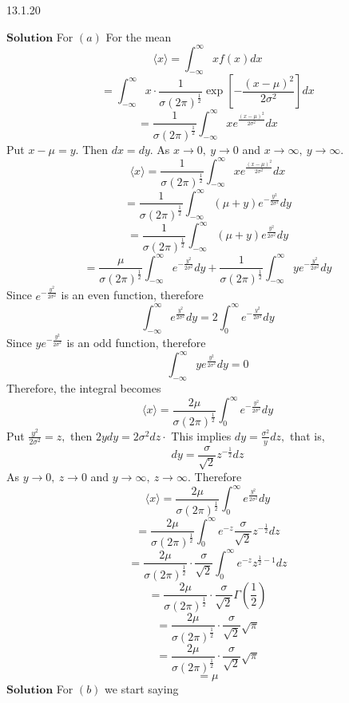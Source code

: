 \documentclass{article}
\begin{document}
\begin{flushleft}
\begin{mybox}{13.1.20}
\end{mybox}

$\boxed{\textbf{Solution}}$ For $(a)$ For the mean
$$
\langle x\rangle=\int_{-\infty}^{\infty} x f(x) d x
$$
$$
=\int_{-\infty}^{\infty} x \cdot \frac{1}{\sigma(2 \pi)^{\frac{1}{2}}} \exp \left[-\frac{(x-\mu)^{2}}{2 \sigma^{2}}\right] d x
$$
$$
=\frac{1}{\sigma(2 \pi)^{\frac{1}{2}}} \int_{-\infty}^{\infty} x e^{\frac{(x-\mu)^{2}}{2 \sigma^{2}}} d x
$$
Put $x-\mu=y .$ Then $d x=d y .$ As $x \rightarrow 0, \  y \rightarrow 0$ and $x \rightarrow \infty, \  y \rightarrow \infty$.
$$
\langle x\rangle=\frac{1}{\sigma(2 \pi)^{\frac{1}{2}}} \int_{-\infty}^{\infty} x e^{\frac{(x-\mu)^{2}}{2 \sigma^{2}}} d x
$$
$$
=\frac{1}{\sigma(2 \pi)^{\frac{1}{2}}} \int_{-\infty}^{\infty}(\mu+y) e^{-\frac{y^{2}}{2 \sigma^{2}}} d y
$$
$$
=\frac{1}{\sigma(2 \pi)^{\frac{1}{2}}} \int_{-\infty}^{\infty}(\mu+y) e^{\frac{y^{2}}{2 \sigma^{2}}} d y
$$
$$
=\frac{\mu}{\sigma(2 \pi)^{\frac{1}{2}}} \int_{-\infty}^{\infty} e^{-\frac{y^{2}}{2 \sigma^{2}}} d y+\frac{1}{\sigma(2 \pi)^{\frac{1}{2}}} \int_{-\infty}^{\infty} y e^{-\frac{y^{2}}{2 \sigma^{2}}} d y
$$
Since $e^{-\frac{y^{2}}{2 \sigma^{2}}}$ is an even function, therefore 
$$\int_{-\infty}^{\infty} e^{\frac{y^{2}}{2 \sigma^{2}}} d y=2 \int_{0}^{\infty} e^{-\frac{y^{2}}{2 \sigma^{2}}} d y$$
Since $y e^{-\frac{y^{2}}{2 \sigma^{2}}}$ is an odd
function, therefore 
$$\int_{-\infty}^{\infty} y e^{\frac{y^{2}}{2 \sigma^{2}}} d y=0$$
Therefore, the integral becomes
$$
\langle x\rangle=\frac{2 \mu}{\sigma(2 \pi)^{\frac{1}{2}}} \int_{0}^{\infty} e^{-\frac{y^{2}}{2 \sigma^{2}}} d y
$$
Put $\frac{y^{2}}{2 \sigma^{2}}=z,$ then $2 y d y=2 \sigma^{2} d z \cdot$ This implies $d y=\frac{\sigma^{2}}{y} d z,$ that is, 
$$d y=\frac{\sigma}{\sqrt{2}} z^{-\frac{1}{2}} d z$$
As $y \rightarrow 0, \  z \rightarrow 0$ and $y \rightarrow \infty, \  z \rightarrow \infty$. Therefore
$$\langle x\rangle=\frac{2 \mu}{\sigma(2 \pi)^{\frac{1}{2}}} \int_{0}^{\infty} e^{\frac{y^{2}}{2 \sigma^{2}}} d y$$
$$=\frac{2 \mu}{\sigma(2 \pi)^{\frac{1}{2}}} \int_{0}^{\infty} e^{-z} \frac{\sigma}{\sqrt{2}} z^{-\frac{1}{2}} d z$$
$$=\frac{2 \mu}{\sigma(2 \pi)^{\frac{1}{2}}} \cdot \frac{\sigma}{\sqrt{2}} \int_{0}^{\infty} e^{-z} z^{\frac{1}{2}-1} d z$$
$$=\frac{2 \mu}{\sigma(2 \pi)^{\frac{1}{2}}} \cdot \frac{\sigma}{\sqrt{2}} \Gamma\left(\frac{1}{2}\right)$$
$$=\frac{2 \mu}{\sigma(2 \pi)^{\frac{1}{2}}} \cdot \frac{\sigma}{\sqrt{2}} \sqrt{\pi}$$
$$=\frac{2 \mu}{\sigma(2 \pi)^{\frac{1}{2}}} \cdot \frac{\sigma}{\sqrt{2}} \sqrt{\pi}$$
$$=\mu$$
$\boxed{\textbf{Solution}}$ For $(b)$ we start saying

\end{flushleft}
\end{document}

